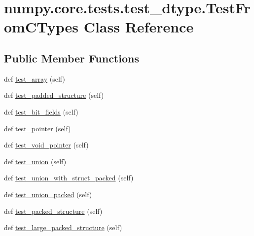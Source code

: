 \hypertarget{classnumpy_1_1core_1_1tests_1_1test__dtype_1_1TestFromCTypes}{}\section{numpy.\+core.\+tests.\+test\+\_\+dtype.\+Test\+From\+C\+Types Class Reference}
\label{classnumpy_1_1core_1_1tests_1_1test__dtype_1_1TestFromCTypes}
\subsection*{Public Member Functions}
\begin{DoxyCompactItemize}
\item 
def \hyperlink{classnumpy_1_1core_1_1tests_1_1test__dtype_1_1TestFromCTypes_a7d65368b32e3f95804ec58455c8920e1}{test\+\_\+array} (self)
\item 
def \hyperlink{classnumpy_1_1core_1_1tests_1_1test__dtype_1_1TestFromCTypes_acb788d0e8b349a7e775f4db874305bfd}{test\+\_\+padded\+\_\+structure} (self)
\item 
def \hyperlink{classnumpy_1_1core_1_1tests_1_1test__dtype_1_1TestFromCTypes_aaee302f265f14ea3df09a5ea0c4b7afd}{test\+\_\+bit\+\_\+fields} (self)
\item 
def \hyperlink{classnumpy_1_1core_1_1tests_1_1test__dtype_1_1TestFromCTypes_aa70f633b2b3d4c3588798f5365eed2c9}{test\+\_\+pointer} (self)
\item 
def \hyperlink{classnumpy_1_1core_1_1tests_1_1test__dtype_1_1TestFromCTypes_ab19b9419700318184ea818247c4ff066}{test\+\_\+void\+\_\+pointer} (self)
\item 
def \hyperlink{classnumpy_1_1core_1_1tests_1_1test__dtype_1_1TestFromCTypes_a857732acec6dabb5ddbb78f38e659a93}{test\+\_\+union} (self)
\item 
def \hyperlink{classnumpy_1_1core_1_1tests_1_1test__dtype_1_1TestFromCTypes_af2c896ea008b43de6c0764edbaffda9f}{test\+\_\+union\+\_\+with\+\_\+struct\+\_\+packed} (self)
\item 
def \hyperlink{classnumpy_1_1core_1_1tests_1_1test__dtype_1_1TestFromCTypes_ad4dbea91c06f94fe253d1a04fa962b88}{test\+\_\+union\+\_\+packed} (self)
\item 
def \hyperlink{classnumpy_1_1core_1_1tests_1_1test__dtype_1_1TestFromCTypes_a21f6c5ed98a7632f4a0e65886caeb6f4}{test\+\_\+packed\+\_\+structure} (self)
\item 
def \hyperlink{classnumpy_1_1core_1_1tests_1_1test__dtype_1_1TestFromCTypes_a55aa2634480711609e529be6ffa566bb}{test\+\_\+large\+\_\+packed\+\_\+structure} (self)

\end{DoxyCompactItemize}

